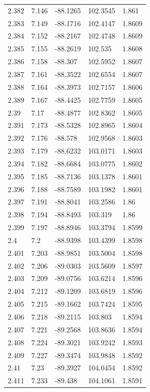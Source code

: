 \begin{tabular}{lllll}
2.382 & 7.146 & -88.1265 & 102.3545 & 1.861 \\
2.383 & 7.149 & -88.1716 & 102.4147 & 1.8609 \\
2.384 & 7.152 & -88.2167 & 102.4748 & 1.8609 \\
2.385 & 7.155 & -88.2619 & 102.535 & 1.8608 \\
2.386 & 7.158 & -88.307 & 102.5952 & 1.8607 \\
2.387 & 7.161 & -88.3522 & 102.6554 & 1.8607 \\
2.388 & 7.164 & -88.3973 & 102.7157 & 1.8606 \\
2.389 & 7.167 & -88.4425 & 102.7759 & 1.8605 \\
2.39 & 7.17 & -88.4877 & 102.8362 & 1.8605 \\
2.391 & 7.173 & -88.5328 & 102.8965 & 1.8604 \\
2.392 & 7.176 & -88.578 & 102.9568 & 1.8603 \\
2.393 & 7.179 & -88.6232 & 103.0171 & 1.8603 \\
2.394 & 7.182 & -88.6684 & 103.0775 & 1.8602 \\
2.395 & 7.185 & -88.7136 & 103.1378 & 1.8601 \\
2.396 & 7.188 & -88.7589 & 103.1982 & 1.8601 \\
2.397 & 7.191 & -88.8041 & 103.2586 & 1.86 \\
2.398 & 7.194 & -88.8493 & 103.319 & 1.86 \\
2.399 & 7.197 & -88.8946 & 103.3794 & 1.8599 \\
2.4 & 7.2 & -88.9398 & 103.4399 & 1.8598 \\
2.401 & 7.203 & -88.9851 & 103.5004 & 1.8598 \\
2.402 & 7.206 & -89.0303 & 103.5609 & 1.8597 \\
2.403 & 7.209 & -89.0756 & 103.6214 & 1.8596 \\
2.404 & 7.212 & -89.1209 & 103.6819 & 1.8596 \\
2.405 & 7.215 & -89.1662 & 103.7424 & 1.8595 \\
2.406 & 7.218 & -89.2115 & 103.803 & 1.8594 \\
2.407 & 7.221 & -89.2568 & 103.8636 & 1.8594 \\
2.408 & 7.224 & -89.3021 & 103.9242 & 1.8593 \\
2.409 & 7.227 & -89.3474 & 103.9848 & 1.8592 \\
2.41 & 7.23 & -89.3927 & 104.0454 & 1.8592 \\
2.411 & 7.233 & -89.438 & 104.1061 & 1.8591 \\

\end{tabular}
